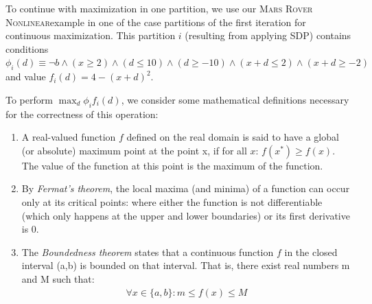 \documentclass[letterpaper]{article}
\newcommand{\MarsRoverNL}{\textsc{Mars Rover Nonlinear}}
\begin{document}
To continue with maximization in one partition, we use our
\MarsRoverNL example in one of the case partitions of the first iteration for
continuous maximization.  This partition $i$ (resulting from applying SDP)
contains conditions $\phi_i(d) \equiv \neg b\wedge
(x\geq 2)\wedge (d\leq 10) \wedge (d\geq -10)\wedge (x+d\leq 2) \wedge
(x+d\geq -2) $ and value $f_i(d) = 4 - (x+d)^2 $.

To perform $\max_d \phi_i f_i(d)$, we consider some mathematical
definitions necessary for the correctness of this operation:
\begin{enumerate}
\item A real-valued function $f$ defined on the real domain is said to
have a global (or absolute) maximum point at the point x, if for all $x$:
$ f(x^{*}) \geq f(x) $. The value of the function at this point is
the maximum of the function.
\item By \emph{Fermat's theorem}, the local maxima (and minima) of a function
can occur only at its critical points: where either the function is not
differentiable (which only happens at the upper and lower boundaries) or its
first derivative is 0.
\item The \emph{Boundedness theorem} states that a continuous function
$f$ in the closed interval (a,b) is bounded on that interval. That is,
there exist real numbers m and M such that:
\begin{align*}
\forall x \in \{a,b\} : m \leq f(x) \leq M 
\end{align*}
\end{enumerate}
\end{document}
